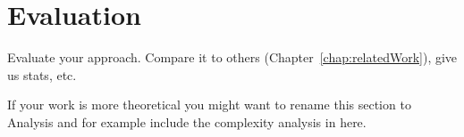 
\chapter{Evaluation}\label{chap:eval}
	Evaluate your approach.
	Compare it to others (Chapter~\ref{chap:relatedWork}), give us stats, etc.
	
	If your work is more theoretical you might want to rename this section to Analysis and for example include the complexity analysis in here.
